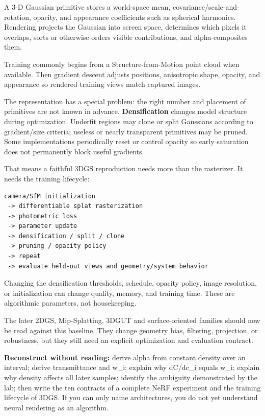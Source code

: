 \hypertarget{04-visual-computing-ii-ch035-d-gaussian-splatting-changes-the-representation-and-rasterization-path-not-the-need-for-training-discipline}{}

A 3-D Gaussian primitive stores a world-space mean, covariance/scale-and-rotation, opacity, and appearance coefficients such as spherical harmonics. Rendering projects the Gaussian into screen space, determines which pixels it overlaps, sorts or otherwise orders visible contributions, and alpha-composites them.

Training commonly begins from a Structure-from-Motion point cloud when available. Then gradient descent adjusts positions, anisotropic shape, opacity, and appearance so rendered training views match captured images.

The representation has a special problem: the right number and placement of primitives are not known in advance. \textbf{Densification} changes model structure during optimization. Underfit regions may clone or split Gaussians according to gradient/size criteria; useless or nearly transparent primitives may be pruned. Some implementations periodically reset or control opacity so early saturation does not permanently block useful gradients.

That means a faithful 3DGS reproduction needs more than the rasterizer. It needs the training lifecycle:

\begin{verbatim}
camera/SfM initialization
 -> differentiable splat rasterization
 -> photometric loss
 -> parameter update
 -> densification / split / clone
 -> pruning / opacity policy
 -> repeat
 -> evaluate held-out views and geometry/system behavior
\end{verbatim}

Changing the densification thresholds, schedule, opacity policy, image resolution, or initialization can change quality, memory, and training time. These are algorithmic parameters, not housekeeping.

The later 2DGS, Mip-Splatting, 3DGUT and surface-oriented families should now be read against this baseline. They change geometry bias, filtering, projection, or robustness, but they still need an explicit optimization and evaluation contract.

\textbf{Reconstruct without reading:} derive alpha from constant density over an interval; derive transmittance and w\_i; explain why dC/dc\_i equals w\_i; explain why density affects all later samples; identify the ambiguity demonstrated by the lab; then write the ten contracts of a complete NeRF experiment and the training lifecycle of 3DGS. If you can only name architectures, you do not yet understand neural rendering as an algorithm.

